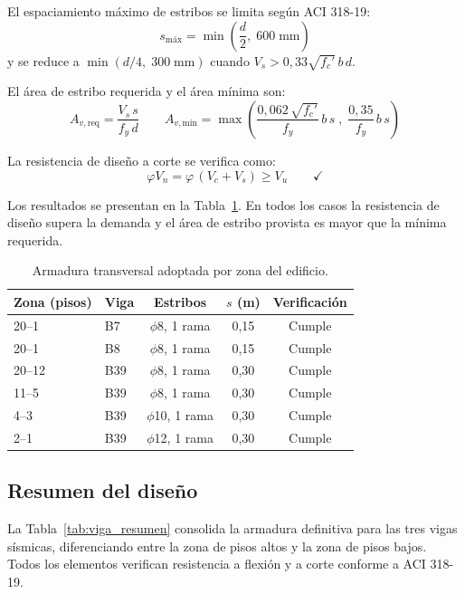 El espaciamiento máximo de estribos se limita según ACI 318-19:
\begin{equation}
    s_{\text{máx}} = \min\!\left(\frac{d}{2},\;600\;\text{mm}\right)
\end{equation}
y se reduce a $\min(d/4,\;300\;\text{mm})$ cuando $V_s > 0{,}33\sqrt{f_c'}\,b\,d$.
 
El área de estribo requerida y el área mínima son:
\begin{equation}
    A_{v,\text{req}} = \frac{V_s\,s}{f_y\,d}
    \qquad
    A_{v,\text{mín}} = \max\!\left(\frac{0{,}062\,\sqrt{f_c'}}{f_y}\,b\,s\;,\;\frac{0{,}35}{f_y}\,b\,s\right)
\end{equation}
 
La resistencia de diseño a corte se verifica como:
\begin{equation}
    \varphi V_n = \varphi\,(V_c + V_s) \geq V_u \qquad \checkmark
\end{equation}
 
Los resultados se presentan en la Tabla~\ref{tab:viga_corte}. En todos los casos la resistencia de
diseño supera la demanda y el área de estribo provista es mayor que la mínima requerida.
 
\begin{table}[H]
\centering
\caption{Armadura transversal adoptada por zona del edificio.}
\label{tab:viga_corte}
\begin{tabular}{llccc}
\hline
Zona (pisos) & Viga & Estribos & $s$ (m) & Verificación \\
\hline
20--1  & B7  & \(\phi\)8,  1 rama  & 0,15 & Cumple \\
20--1  & B8  & \(\phi\)8,  1 rama  & 0,15 & Cumple \\
20--12 & B39 & \(\phi\)8,  1 rama  & 0,30 & Cumple \\
11--5  & B39 & \(\phi\)8,  1 rama  & 0,30 & Cumple \\
4--3   & B39 & \(\phi\)10, 1 rama  & 0,30 & Cumple \\
2--1   & B39 & \(\phi\)12, 1 rama  & 0,30 & Cumple \\
\hline
\end{tabular}
\end{table}
 
\subsection{Resumen del diseño}
 
La Tabla~\ref{tab:viga_resumen} consolida la armadura definitiva para las tres vigas sísmicas,
diferenciando entre la zona de pisos altos y la zona de pisos bajos. Todos los elementos verifican
resistencia a flexión y a corte conforme a ACI 318-19.
 
